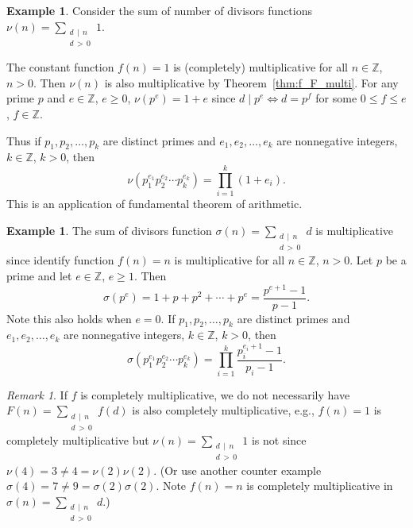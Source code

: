 \documentclass{amsbook}
\theoremstyle{plain}
\theoremstyle{definition}
\newtheorem{example}[theorem]{Example}
\theoremstyle{remark}
\newtheorem{remark}[theorem]{Remark}
\numberwithin{equation}{chapter}
\numberwithin{figure}{chapter}
\newcommand{\Z}{\mathbb{Z}}
\begin{document}
\begin{example}
 Consider the sum of number of divisors functions $\nu (n) = \sum_{\substack{d \, \mid \, n \\ d \, > \, 0}} 1$. 

The constant function $f(n) = 1$ is (completely) multiplicative for all $n \in \Z$, $n > 0$. Then $\nu (n) $ is also multiplicative by Theorem~\ref{thm:f_F_multi}. For any prime $p$ and $e \in \Z$, $e \geqslant 0$, $\nu (p^e) = 1+e$ since $ d \mid p^e \iff d = p^f$ for some $0 \leqslant f \leqslant e$, $f \in \Z$.

Thus if $p_1, p_2, \ldots, p_k$ are distinct primes and $e_1, e_2, \ldots, e_k$ are nonnegative integers, $k \in \Z$, $k > 0$, then
\[
\nu (p_1^{e_1}p_2^{e_2}\cdots p_k^{e_k}) = \prod_{i = 1}^k (1 + e_i).
\]
This is an application of fundamental theorem of arithmetic. 
\end{example}

\begin{example}
The sum of divisors function $\sigma (n) = \sum_{\substack{d \, \mid \, n \\ d \, > \, 0}} d$ is multiplicative since identify function $f(n) = n$ is multiplicative for all $n \in \Z$, $n > 0$. Let $p$ be a prime and let $e \in \Z$, $e \geqslant 1$. Then 
\[
\sigma (p^e) = 1 + p + p^2 + \cdots + p^e = \frac{p^{e+1} - 1}{p-1}.
\]
Note this also holds when $e = 0$. If $p_1, p_2, \ldots, p_k$ are distinct primes and $e_1, e_2, \ldots, e_k$ are nonnegative integers, $k \in \Z$, $k > 0$, then
\[
\sigma (p_1^{e_1}p_2^{e_2}\cdots p_k^{e_k}) = \prod_{i = 1}^k \frac{p_i^{e_i+1} - 1}{p_i-1}.
\]
\end{example}
\begin{remark}
  If $f$ is completely multiplicative, we do not necessarily have $F(n) = \sum_{\substack{d \, \mid \, n \\ d \, > \, 0}} f(d)$ is also completely multiplicative, e.g., $f(n) = 1$ is completely multiplicative but $\nu (n) = \sum_{\substack{d \, \mid \, n \\ d \, > \, 0}} 1$ is not since $\nu (4) = 3 \neq 4 = \nu (2) \nu (2)$. (Or use another counter example $\sigma (4) = 7 \neq 9 = \sigma (2) \sigma (2)$. Note $f(n) = n$ is completely multiplicative in $\sigma (n) = \sum_{\substack{d \, \mid \, n \\ d \, > \, 0}} d$.)
\end{remark}
\end{document}
